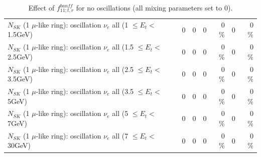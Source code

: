 \begin{table}
\begin{tabular}{| l | r | r | r  r | r  r |}
$N_{SK}$ (1 $\mu$-like ring): oscillation $\nu_{e}$ all (1 $\leq E_{t} <$ 1.5GeV) &               0 &               0 &               0 &        0 \%  &               0 &        0 \%  \\ 
$N_{SK}$ (1 $\mu$-like ring): oscillation $\nu_{e}$ all (1.5 $\leq E_{t} <$ 2.5GeV) &               0 &               0 &               0 &        0 \%  &               0 &        0 \%  \\ 
$N_{SK}$ (1 $\mu$-like ring): oscillation $\nu_{e}$ all (2.5 $\leq E_{t} <$ 3.5GeV) &               0 &               0 &               0 &        0 \%  &               0 &        0 \%  \\ 
$N_{SK}$ (1 $\mu$-like ring): oscillation $\nu_{e}$ all (3.5 $\leq E_{t} <$ 5GeV) &               0 &               0 &               0 &        0 \%  &               0 &        0 \%  \\ 
 $N_{SK}$ (1 $\mu$-like ring): oscillation $\nu_{e}$ all (5 $\leq E_{t} <$ 7GeV) &               0 &               0 &               0 &        0 \%  &               0 &        0 \%  \\ 
$N_{SK}$ (1 $\mu$-like ring): oscillation $\nu_{e}$ all (7 $\leq E_{t} <$ 30GeV) &               0 &               0 &               0 &        0 \%  &               0 &        0 \%  \\ 
\hline
\hline
\end{tabular}
\caption{ Effect of $f_{11; t, r}^{banff}$ for no oscillations (all mixing parameters set to 0). }
\label{tab:num_banff_11_1RmuT_3f_osc_t13:0}
\end{table}
\clearpage
